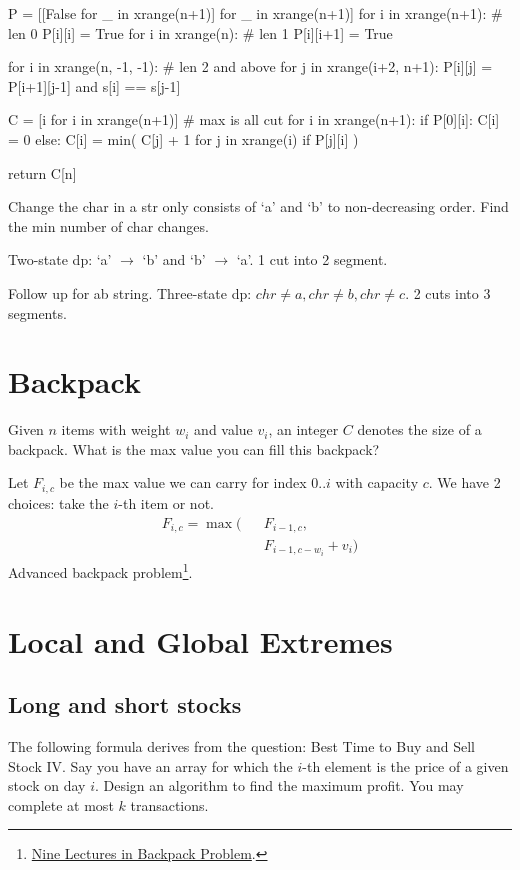 {\begin{python}
  P = [[False for _ in xrange(n+1)] for _ in xrange(n+1)]
  for i in xrange(n+1):  # len 0
    P[i][i] = True
  for i in xrange(n):  # len 1
    P[i][i+1] = True

  for i in xrange(n, -1, -1):  # len 2 and above
    for j in xrange(i+2, n+1):
      P[i][j] = P[i+1][j-1] and s[i] == s[j-1]

  C = [i for i in xrange(n+1)]  # max is all cut
  for i in xrange(n+1):
    if P[0][i]:
      C[i] = 0
    else:
      C[i] = min(
          C[j] + 1
          for j in xrange(i)
          if P[j][i]
      )

  return C[n]
\end{python}
 Change the char in a str only consists of `a' and `b' to non-decreasing order. Find the min number of char changes. 

Two-state dp: `a' $\rightarrow$ `b' and  `b' $\rightarrow$ `a'. 1 cut into 2 segment.

 Follow up for ab string. Three-state dp: $chr \neq a, chr \neq b, chr \neq c$. 2 cuts into 3 segments. 
\section{Backpack}
Given $n$ items with weight $w_i$ and value $v_i$, an integer $C$ denotes the size of a backpack. What is the max value you can fill this backpack?

Let $F_{i, c}$ be the max value we can carry for index $0..i$ with capacity $c$. We have 2 choices: take the $i$-th item or not.
\begin{eqnarray*}
F_{i, c}= \max\big(&&F_{i-1, c}, \\
&&F_{i-1, c-w_i}+v_i\big)
\end{eqnarray*}
Advanced backpack problem\footnote{\href{http://github.com/tianyicui/pack}{Nine Lectures in Backpack Problem}.}. 

\section{Local and Global Extremes}
\subsection{Long and short stocks}
The following formula derives from the question: Best Time to Buy and Sell Stock IV. Say you have an array for which the $i$-th element is the price of a given stock on day $i$. Design an algorithm to find the maximum profit. You may complete at most $k$ transactions. 

}
